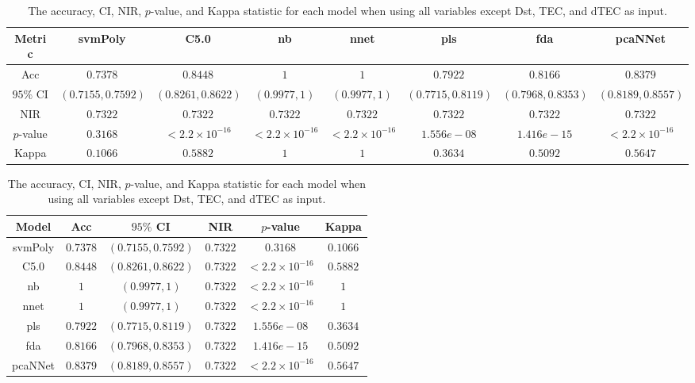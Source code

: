 \begin{table}[!ht]
	\centering
	\begin{tabular}{|c|c|c|c|c|c|c|c|}
		\hline
		Metric & svmPoly & C5.0 & nb & nnet & pls & fda & pcaNNet \\ \hline
		Acc & $0.7378$ & $0.8448$ & $1$ & $1$ & $0.7922$ & $0.8166$ & $0.8379$ \\ \hline
		$95\%$ CI & $(0.7155, 0.7592)$ & $(0.8261, 0.8622)$ & $(0.9977, 1)$ & $(0.9977, 1)$ & $(0.7715, 0.8119)$ & $(0.7968, 0.8353)$ & $(0.8189, 0.8557)$ \\ \hline
		NIR & $0.7322$ & $0.7322$ & $0.7322$ & $0.7322$ & $0.7322$ & $0.7322$ & $0.7322$ \\ \hline
		$p$-value & $0.3168$ & $< 2.2 \times {10}^{-16}$ & $< 2.2 \times {10}^{-16}$ & $< 2.2 \times {10}^{-16}$ & $1.556e-08$ & $1.416e-15$ & $< 2.2 \times {10}^{-16}$ \\ \hline
		Kappa & $0.1066$ & $0.5882$ & $1$ & $1$ & $0.3634$ & $0.5092$ & $0.5647$ \\ \hline
	\end{tabular}
	\caption{The accuracy, CI, NIR, $p$-value, and Kappa statistic for each model when using all variables except Dst, TEC, and dTEC as input.}
	\label{tab:stats:noTEC}
\end{table}

\begin{table}[!ht]
	\centering
	\begin{tabular}{|c|c|c|c|c|c|}
		\hline
		Model & Acc & $95\%$ CI & NIR & $p$-value & Kappa \\ \hline
		svmPoly & $0.7378$ & $(0.7155, 0.7592)$ & $0.7322$ & $0.3168$ & $0.1066$ \\ \hline
		C5.0 & $0.8448$ & $(0.8261, 0.8622)$ & $0.7322$ & $< 2.2 \times {10}^{-16}$ & $0.5882$ \\ \hline
		nb & $1$ & $(0.9977, 1)$ & $0.7322$ & $< 2.2 \times {10}^{-16}$ & $1$ \\ \hline
		nnet & $1$ & $(0.9977, 1)$ & $0.7322$ & $< 2.2 \times {10}^{-16}$ & $1$ \\ \hline
		pls & $0.7922$ & $(0.7715, 0.8119)$ & $0.7322$ & $1.556e-08$ & $0.3634$ \\ \hline
		fda & $0.8166$ & $(0.7968, 0.8353)$ & $0.7322$ & $1.416e-15$ & $0.5092$ \\ \hline
		pcaNNet & $0.8379$ & $(0.8189, 0.8557)$ & $0.7322$ & $< 2.2 \times {10}^{-16}$ & $0.5647$ \\ \hline
	\end{tabular}
	\caption{The accuracy, CI, NIR, $p$-value, and Kappa statistic for each model when using all variables except Dst, TEC, and dTEC as input.}
	\label{tab:stats:reverse:noTEC}
\end{table}

